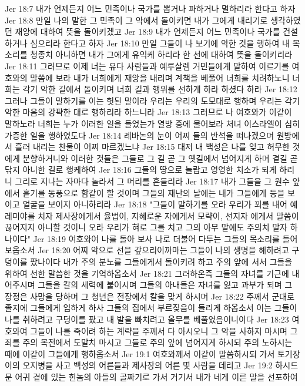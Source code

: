 Jer 18:7  내가 언제든지 어느 민족이나 국가를 뽑거나 파하거나 멸하리라 한다고 하자
Jer 18:8  만일 나의 말한 그 민족이 그 악에서 돌이키면 내가 그에게 내리기로 생각하였던 재앙에 대하여 뜻을 돌이키겠고
Jer 18:9  내가 언제든지 어느 민족이나 국가를 건설하거나 심으리라 한다고 하자
Jer 18:10  만일 그들이 나 보기에 악한 것을 행하여 내 목소리를 청종치 아니하면 내가 그에게 유익케 하리라 한 선에 대하여 뜻을 돌이키리라
Jer 18:11  그러므로 이제 너는 유다 사람들과 예루살렘 거민들에게 말하여 이르기를 여호와의 말씀에 보라 내가 너희에게 재앙을 내리며 계책을 베풀어 너희를 치려하노니 너희는 각기 악한 길에서 돌이키며 너희 길과 행위를 선하게 하라 하셨다 하라
Jer 18:12  그러나 그들이 말하기를 이는 헛된 말이라 우리는 우리의 도모대로 행하며 우리는 각기 악한 마음의 강퍅한 대로 행하리라 하느니라
Jer 18:13  그러므로 나 여호와가 이같이 말하노라 너희는 누가 이러한 일을 들었는가 열방 중에 물어보라 처녀 이스라엘이 심히 가증한 일을 행하였도다
Jer 18:14  레바논의 눈이 어찌 들의 반석을 떠나겠으며 원방에서 흘러 내리는 찬물이 어찌 마르겠느냐
Jer 18:15  대저 내 백성은 나를 잊고 허무한 것에게 분향하거니와 이러한 것들은 그들로 그 길 곧 그 옛길에서 넘어지게 하며 곁길 곧 닦지 아니한 길로 행케하여
Jer 18:16  그들의 땅으로 놀랍고 영영한 치소가 되게 하리니 그리로 지나는 자마다 놀라서 그 머리를 흔들리라
Jer 18:17  내가 그들을 그 원수 앞에서 흩기를 동풍으로 함같이 할 것이며 그들의 재난의 날에는 내가 그들에게 등을 보이고 얼굴을 보이지 아니하리라
Jer 18:18  "그들이 말하기를 오라 우리가 꾀를 내어 예레미야를 치자 제사장에게서 율법이, 지혜로운 자에게서 모략이, 선지자 에게서 말씀이 끊어지지 아니할 것이니 오라 우리가 혀로 그를 치고 그의 아무 말에도 주의치 말자 하나이다"
Jer 18:19  여호와여 나를 돌아 보사 나로 더불어 다투는 그들의 목소리를 들어보옵소서
Jer 18:20  어찌 악으로 선을 갚으리이까마는 그들이 나의 생명을 해하려고 구덩이를 팠나이다 내가 주의 분노를 그들에게서 돌이키려 하고 주의 앞에 서서 그들을 위하여 선한 말씀한 것을 기억하옵소서
Jer 18:21  그러하온즉 그들의 자녀를 기근에 내어주시며 그들을 칼의 세력에 붙이시며 그들의 아내들은 자녀를 잃고 과부가 되며 그 장정은 사망을 당하며 그 청년은 전장에서 칼을 맞게 하시며
Jer 18:22  주께서 군대로 졸지에 그들에게 임하게 하사 그들의 집에서 부르짖음이 들리게 하옵소서 이는 그들이 나를 취하려고 구덩이를 팠고 내 발을 빠치려고 올무를 베풀었음이니이다
Jer 18:23  여호와여 그들이 나를 죽이려 하는 계략을 주께서 다 아시오니 그 악을 사하지 마시며 그 죄를 주의 목전에서 도말치 마시고 그들로 주의 앞에 넘어지게 하시되 주의 노하시는 때에 이같이 그들에게 행하옵소서
Jer 19:1  여호와께서 이같이 말씀하시되 가서 토기장이의 오지병을 사고 백성의 어른들과 제사장의 어른 몇 사람을 데리고
Jer 19:2  하시드 문 어귀 곁에 있는 힌놈의 아들의 골짜기로 가서 거기서 내가 네게 이른 말을 선포하여
